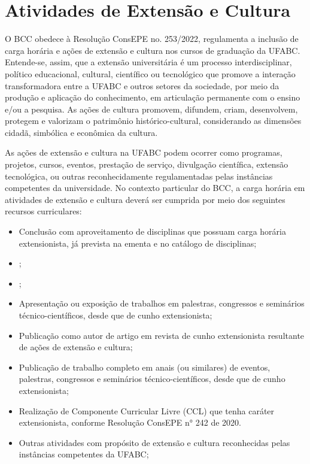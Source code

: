 \section{Atividades de Extensão e Cultura}
\label{sec:extensao}

O BCC obedece à Resolução ConsEPE no. 253/2022, regulamenta a inclusão de carga horária e ações de extensão e cultura nos cursos de graduação da UFABC. Entende-se, assim, que a extensão universitária é um processo interdisciplinar, político educacional, cultural, científico ou tecnológico que promove a interação transformadora entre a UFABC e outros setores da sociedade, por meio da produção e aplicação do conhecimento, em articulação permanente com o ensino e/ou a pesquisa. As ações de cultura promovem, difundem, criam, desenvolvem, protegem e valorizam o patrimônio histórico-cultural, considerando as dimensões cidadã, simbólica e econômica da cultura.

As ações de extensão e cultura na UFABC podem ocorrer como programas, projetos, cursos, eventos, prestação de serviço, divulgação científica, extensão tecnológica, ou outras reconhecidamente regulamentadas pelas instâncias competentes da universidade. 
No contexto particular do BCC, a carga horária em atividades de extensão e cultura deverá ser cumprida por meio dos seguintes recursos curriculares:
\begin{itemize}
	\item Conclusão com aproveitamento de disciplinas que possuam carga horária extensionista, já prevista na ementa e no catálogo de disciplinas;
	\item {}; 
	\item {};
	\item Apresentação ou exposição de trabalhos em palestras, congressos e	seminários técnico-científicos, desde que de cunho extensionista;
	\item Publicação como autor de artigo em revista de cunho extensionista resultante de ações de extensão e cultura;
	\item Publicação de trabalho completo em anais (ou similares) de eventos, palestras, congressos e seminários técnico-científicos, desde que de cunho extensionista;
	\item Realização de Componente Curricular Livre (CCL) que tenha caráter extensionista, conforme Resolução ConsEPE n° 242 de 2020.
	\item Outras atividades com propósito de extensão e cultura reconhecidas pelas instâncias competentes da UFABC;
\end{itemize}

